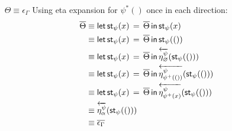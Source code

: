 \documentclass[10pt]{article}
\theoremstyle{definition}
\let\emptyset\varnothing
\newcommand{\rewrite}[2]{\overleftarrow{#1}(#2)}
\newcommand\St[2]{\ensuremath{{#1}^*(#2)}}
\newcommand\StI[2]{\ensuremath{\mathsf{st}_{#1}(#2)}}
\newcommand\StE[4]{\ensuremath{\mathsf{let} \, \StI{#1}{#3} \, = \, {#2} \, \mathsf{in} \, #4}}
\newcommand\TrPlus[2]{\ensuremath{{#1}^+(#2)}}
\begin{document}
\begin{enumerate}[style = multiline, labelwidth = 80pt]
\item[$\Theta \equiv \epsilon_\Gamma$] Using eta expansion for $\St{\psi}{}$ once in each direction:
\begin{align*}
\upstairs{\Theta} 
&\equiv \StE{\psi}{\upstairs{\Theta}}{x}{\StI{\psi}{x}} \\
&\equiv \StE{\psi}{\upstairs{\Theta}}{x}{\StI{\psi}{()}} \\
&\equiv \StE{\psi}{\upstairs{\Theta}}{x}{\rewrite{\eta^\psi_{\emptyset}}{\StI{\psi}{()}}} \\
&\equiv \StE{\psi}{\upstairs{\Theta}}{x}{\rewrite{\eta^\psi_{\TrPlus{\psi}{()}}}{\StI{\psi}{()}}} \\
&\equiv \StE{\psi}{\upstairs{\Theta}}{x}{\rewrite{\eta^\psi_{\TrPlus{\psi}{x}}}{\StI{\psi}{()}}} \\
&\equiv \rewrite{\eta^\psi_{\alpha}}{\StI{\psi}{()}} \\
&\equiv \upstairs{\epsilon_\Gamma}
\end{align*}
\end{enumerate}
\end{document}
